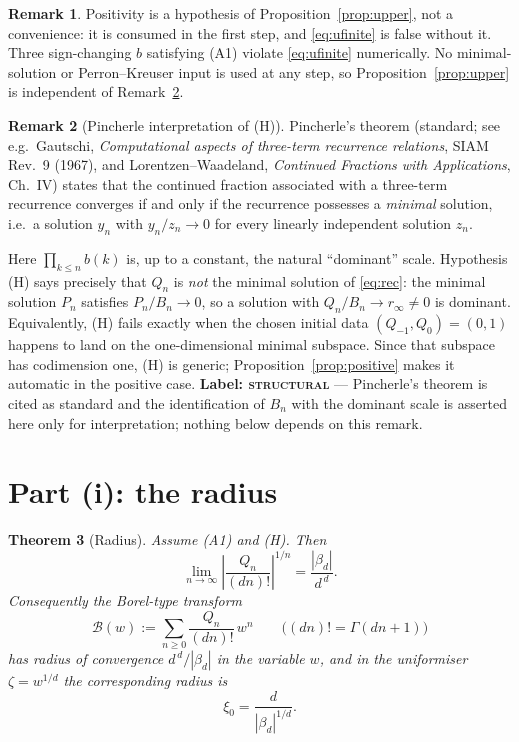 \documentclass[11pt]{article}
\newtheorem{theorem}{Theorem}
\theoremstyle{definition}
\newtheorem{remark}[theorem]{Remark}
\newcommand{\bd}{\beta_d}
\newcommand{\rinf}{r_\infty}
\begin{document}
\begin{remark}\label{rem:upper-positivity}
Positivity is a hypothesis of Proposition~\ref{prop:upper}, not a convenience:
it is consumed in the first step, and \eqref{eq:ufinite} is false without it.
Three sign-changing $b$ satisfying \textup{(A1)} violate \eqref{eq:ufinite}
numerically. No minimal-solution or Perron--Kreuser input is used at any step,
so Proposition~\ref{prop:upper} is independent of Remark~\ref{rem:pincherle}.
\end{remark}

\begin{remark}[Pincherle interpretation of (H)]\label{rem:pincherle}
Pincherle's theorem (standard; see e.g.\ Gautschi, \emph{Computational aspects
of three-term recurrence relations}, SIAM Rev.\ 9 (1967), and Lorentzen--Waadeland,
\emph{Continued Fractions with Applications}, Ch.~IV) states that the continued
fraction associated with a three-term recurrence converges if and only if the
recurrence possesses a \emph{minimal} solution, i.e.\ a solution $y_n$ with
$y_n/z_n\to0$ for every linearly independent solution $z_n$.

Here $\prod_{k\le n}b(k)$ is, up to a constant, the natural ``dominant'' scale.
Hypothesis (H) says precisely that $Q_n$ is \emph{not} the minimal solution of
\eqref{eq:rec}: the minimal solution $P_n$ satisfies $P_n/B_n\to0$, so a
solution with $Q_n/B_n\to\rinf\neq0$ is dominant. Equivalently, (H) fails exactly
when the chosen initial data $(Q_{-1},Q_0)=(0,1)$ happens to land on the
one-dimensional minimal subspace. Since that subspace has codimension one, (H) is
generic; Proposition~\ref{prop:positive} makes it automatic in the positive case.
\textbf{Label: \textsc{structural}} --- Pincherle's theorem is cited as standard
and the identification of $B_n$ with the dominant scale is asserted here only for
interpretation; nothing below depends on this remark.
\end{remark}

\section{Part (i): the radius}

\begin{theorem}[Radius]\label{thm:radius}
Assume \textup{(A1)} and \textup{(H)}. Then
\begin{equation}\label{eq:radius}
\lim_{n\to\infty}\left|\frac{Q_n}{(dn)!}\right|^{1/n}=\frac{|\bd|}{d^{\,d}} .
\end{equation}
Consequently the Borel-type transform
\begin{equation}\label{eq:borel}
\mathcal{B}(w):=\sum_{n\ge0}\frac{Q_n}{(dn)!}\,w^n
\qquad\bigl((dn)!=\Gamma(dn+1)\bigr)
\end{equation}
has radius of convergence $d^{\,d}/|\bd|$ in the variable $w$, and in the
uniformiser $\zeta=w^{1/d}$ the corresponding radius is
\begin{equation}\label{eq:xi0}
\xi_0=\frac{d}{|\bd|^{1/d}} .
\end{equation}
\end{theorem}
\end{document}
